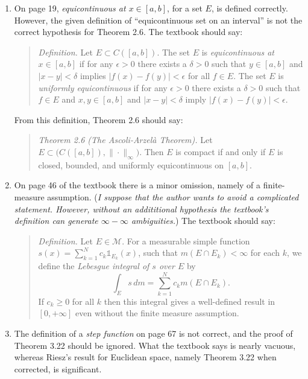 \documentclass[12pt]{amsart}
\newcommand{\cM}{\mathcal{M}}
\newcommand{\eps}{\epsilon}
\newcommand{\one}{\mathds{1}}
\begin{document}
\renewcommand{\labelenumi}{\arabic{enumi}. \,}
\begin{enumerate}
\item On page 19, \emph{equicontinuous at $x \in [a,b]$}, for a set $E$, is defined correctly.  However, the given definition of ``equicontinuous set on an interval'' is not the correct hypothesis for Theorem 2.6.  The textbook should say:

\medskip
\begin{quote}
\emph{Definition.}  Let $E\subset C([a,b])$.  The set $E$ is \emph{equicontinuous at} $x\in[a,b]$ if for any $\eps>0$ there exists a $\delta>0$ such that $y\in[a,b]$ and $|x-y|<\delta$ implies $|f(x)-f(y)|<\eps$ for all $f\in E$.  The set $E$ is \emph{uniformly equicontinuous} if for any $\eps>0$ there exists a $\delta > 0$ such that $f\in E$ and $x,y\in[a,b]$ and $|x-y|<\delta$ imply $|f(x)-f(y)|<\eps$.
\end{quote}

\medskip \noindent From this definition, Theorem 2.6 should say:

\medskip
\begin{quote}
\emph{Theorem 2.6 (The Ascoli-Arzel\`a Theorem).}  Let $E\subset \big(C([a,b]), \|\cdot\|_\infty\big)$.  Then $E$ is compact if and only if $E$ is closed, bounded, and uniformly equicontinuous on $[a,b]$.
\end{quote}

\bigskip
\item On page 46 of the textbook there is a minor omission, namely of a finite-measure assumption.  (\emph{I suppose that the author wants to avoid a complicated statement.  However, without an addititional hypothesis the textbook's definition can generate $\infty-\infty$ ambiguities.})  The textbook should say:

\medskip
\begin{quote}
\emph{Definition.}  Let $E \in \cM$.  For a measurable simple function $s(x) = \sum_{k=1}^N c_k \one_{E_k}(x)$, such that $m(E\cap E_k)<\infty$ for each $k$, we define the \emph{Lebesgue integral of $s$ over $E$} by
	$$\int_E s\,dm = \sum_{k=1}^N c_k m(E\cap E_k).$$
If $c_k\ge 0$ for all $k$ then this integral gives a well-defined result in $[0,+\infty]$ even without the finite measure assumption.
\end{quote}

\bigskip
\item The definition of a \emph{step function} on page 67 is not correct, and the proof of Theorem 3.22 should be ignored.  What the textbook says is nearly vacuous, whereas Riesz's result for Euclidean space, namely Theorem 3.22 when corrected, is significant.


\end{enumerate}
\end{document}
